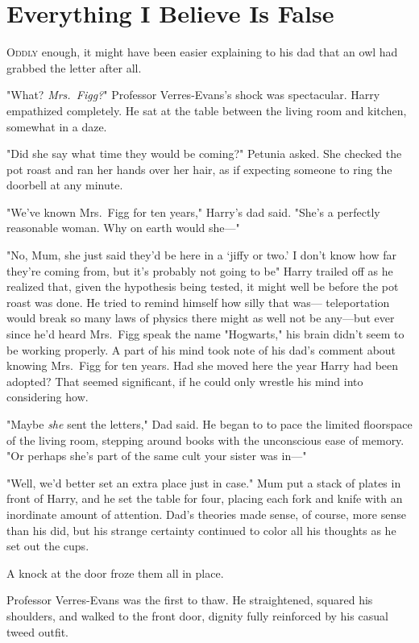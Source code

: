 \chapter{Everything I Believe Is False}

\lettrine{O}{ddly} enough, it might have been easier explaining to his
dad that an owl had grabbed the letter after all.

"What? \emph{Mrs.~Figg?}" Professor Verres-Evans's shock was
spectacular. Harry empathized completely. He sat at the
table between the living room and kitchen, somewhat in a daze.

"Did she say what time they would be coming?" Petunia
asked. She checked the pot roast and ran her hands over
her hair, as if expecting someone to ring the doorbell at any minute.

"We've known Mrs.~Figg for ten years," Harry's dad said.
"She's a perfectly reasonable woman. Why on earth would
she—"

"No, Mum, she just said they'd be here in a `jiffy or two.'
I don't know how far they're coming from, but it's probably not
going to be{\el}" Harry trailed off as he realized that, given
the hypothesis being tested, it might well be before the pot
roast was done. He tried to remind himself how silly that was—
teleportation would break so many laws of physics there
might as well not be any—but ever since he'd heard Mrs.~Figg
speak the name "Hogwarts," his brain
didn't seem to be working properly. A part of his mind
took note of his dad's comment about knowing Mrs.~Figg
for ten years. Had she moved here the year Harry had
been adopted? That seemed significant, if he could only
wrestle his mind into considering how.

"Maybe \emph{she} sent the letters," Dad said. He began to to
pace the limited floorspace of the living room, stepping
around books with the unconscious ease of memory. "Or perhaps
she's part of the same cult your sister was in—"

"Well, we'd better set an extra place just in case." Mum put a
stack of plates in front of Harry, and he set the table for
four, placing each fork and knife with an inordinate amount
of attention. Dad's theories made sense, of course, more
sense than his did, but his strange certainty continued to
color all his thoughts as he set out the cups.

A knock at the door froze them all in place.

Professor Verres-Evans was the first to thaw. He straightened, squared his
shoulders, and walked to the front door, dignity fully
reinforced by his casual tweed outfit.

